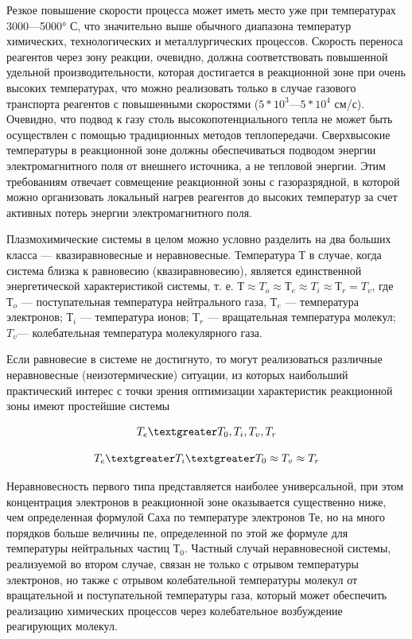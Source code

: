 \documentclass[10pt, a4paper]{article}
\numberwithin{equation}{section}
\begin{document}
Резкое повышение скорости процесса может иметь место уже при температурах 3000—5000° С, что значительно выше обычного диапазона температур химических, технологических и  металлургических процессов. Скорость переноса реагентов через зону реакции, очевидно, должна соответствовать повышенной удельной производительности, которая достигается в реакционной зоне при очень высоких температурах, что можно реализовать только в случае газового транспорта реагентов с повышенными скоростями ($5*10^{3}—5*10^{4}$ см/с). 
Очевидно, что подвод к газу столь высокопотенциального тепла не может быть осуществлен с помощью традиционных методов теплопередачи. Сверхвысокие температуры в реакционной зоне должны обеспечиваться подводом энергии электромагнитного поля от внешнего источника, а не тепловой энергии. Этим требованиям отвечает совмещение реакционной зоны с газоразрядной, в которой можно организовать локальный нагрев реагентов до высоких температур за счет активных потерь энергии электромагнитного поля.

Плазмохимические системы в целом можно условно разделить на два больших класса — квазиравновесные и неравновесные.
Температура Т в случае, когда система близка к равновесию (квазиравновесию), является единственной энергетической характеристикой системы, т. е. $Т \approx T_{o} \approx Т_{e} \approx T_{i} \approx  Т_{r} = T_{v}$, где $Т_{o}$ — поступательная температура нейтрального газа, $Т_e$ — температура электронов; $Т_i$ — температура ионов; $Т_r$ — вращательная температура молекул; $T_v$— колебательная температура молекулярного газа. 

Если равновесие в системе не достигнуто, то могут реализоваться различные неравновесные (неизотермические) ситуации, из которых наибольший практический интерес с точки зрения оптимизации характеристик реакционной зоны имеют простейшие системы 

\begin{equation}
T_e \textgreater T_0, T_i, T_v,T_r
\end{equation}

\begin{equation}
T_e \textgreater T_i \textgreater T_0  \approx T_v  \approx T_r
\end{equation}

Неравновесность первого типа представляется наиболее универсальной, при этом концентрация электронов в реакционной зоне оказывается существенно ниже, чем определенная формулой Саха по температуре электронов Те, но на много порядков больше величины пе, определенной по этой же формуле для температуры  нейтральных частиц $Т_0$. Частный случай неравновесной системы, реализуемой во втором случае, связан не только с отрывом температуры электронов, но также с отрывом колебательной температуры  молекул от вращательной и поступательной температуры газа, который может обеспечить реализацию химических процессов через колебательное возбуждение реагирующих молекул. 
\end{document}
